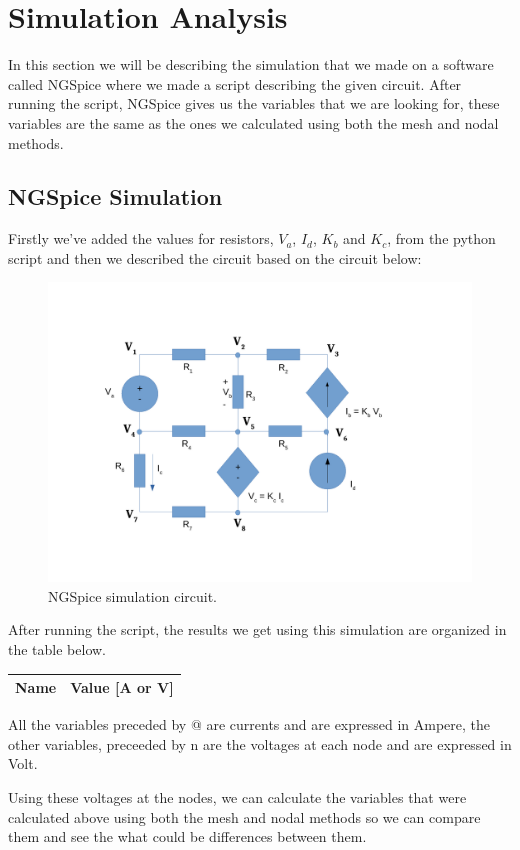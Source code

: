 \section{Simulation Analysis}
\label{sec:simulation}

In this section we will be describing the simulation that we made on a software called NGSpice where we made a script describing the given circuit. After running the script, NGSpice gives us the variables that we are looking for, these variables are the same as the ones we calculated using both the mesh and nodal methods.

\subsection{NGSpice Simulation}

Firstly we’ve added the values for resistors, $V_a$, $I_d$, $K_b$ and $K_c$, from the python script and then we described the circuit based on the circuit below:

\begin{figure}[H] \centering
\includegraphics[width=0.7\linewidth]{ngspice.pdf}
\caption{NGSpice simulation circuit.}
\label{fig:ngspice}
\end{figure}


After running the script, the results we get using this simulation are organized in the table below.

\begin{table}[H]
  \centering
  \begin{tabular}{|l|r|}
    \hline    
    {\bf Name} & {\bf Value [A or V]} \\ \hline
    
  \end{tabular}
  \label{tab:op}
\end{table}

All the variables preceded by @ are currents and are expressed in Ampere, the other variables, preceeded by n are the voltages at each node and are expressed in Volt. \par
Using these voltages at the nodes, we can calculate the variables that were calculated above using both the mesh and nodal methods so we can compare them and see the what could be differences between them. \par

